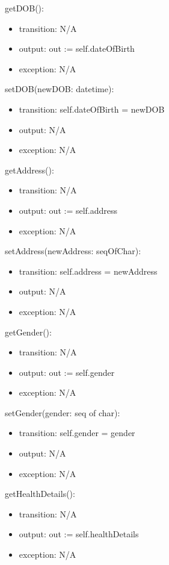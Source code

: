\documentclass[12pt, titlepage]{article}
\begin{document}
\noindent getDOB():
\begin{itemize}
\item transition: N/A
\item output: out := self.dateOfBirth
\item exception: N/A
\end{itemize}

\noindent setDOB(newDOB: datetime):
\begin{itemize}
\item transition: self.dateOfBirth = newDOB
\item output: N/A
\item exception: N/A
\end{itemize}

\noindent getAddress():
\begin{itemize}
\item transition: N/A
\item output: out := self.address
\item exception: N/A
\end{itemize}

\noindent setAddress(newAddress: seqOfChar):
\begin{itemize}
\item transition: self.address = newAddress
\item output: N/A
\item exception: N/A
\end{itemize}

\noindent getGender():
\begin{itemize}
\item transition: N/A
\item output: out := self.gender
\item exception: N/A
\end{itemize}

\noindent setGender(gender: seq of char):
\begin{itemize}
\item transition: self.gender = gender
\item output: N/A
\item exception: N/A
\end{itemize}

\noindent getHealthDetails():
\begin{itemize}
\item transition: N/A
\item output: out := self.healthDetails
\item exception: N/A
\end{itemize}
\end{document}
